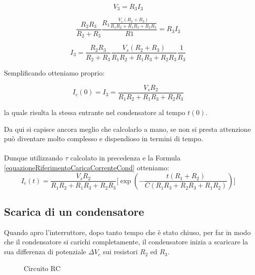\begin{equation*}
    V_3 = R_3 I_3
\end{equation*}

\begin{equation*}
    \frac{R_2R_3}{R_2+R_3} \frac{R_1 \frac{V_s(R_2+R_3)}{R_1R_2 + R_1R_3+R_2R_3}}{R1} = R_3 I_3
\end{equation*}

\begin{equation*}
    I_3 =  \frac{R_2R_3}{R_2+R_3} \frac{V_s(R_2+R_3)}{R_1R_2 + R_1R_3+R_2R_3} \frac{1}{R_3}
\end{equation*}

Semplificando otteniamo proprio:

\begin{equation*}
   I_c(0) = I_3 = \frac{V_sR_2}{R_1R_2 + R_1R_3+R_2R_3}
\end{equation*}

la quale risulta la stessa entrante nel condensatore al tempo $t(0)$.

Da qui si capisce ancora meglio che calcolarlo a mano, se non si presta attenzione può diventare molto complesso e dispendioso in termini di tempo.

\paragraph{}

Dunque utilizzando $\tau$ calcolato in precedenza e la Formula \ref{equazioneRiferimentoCaricaCorrenteCond} otteniamo:
\begin{equation}
    I_c(t) = \frac{V_sR_2}{R_1R_2 + R_1R_3+R_2R_3}\biggl[\exp(-\frac{t(R_1 + R_2)}{C(R_1R_3 + R_2R_3 + R_1R_2)})\biggl]
\end{equation}

\subsection{Scarica di un condensatore}
Quando apro l'interruttore, dopo tanto tempo che è stato chiuso, per far in modo che il condensatore si carichi completamente, il condensatore inizia a scaricare la sua differenza di potenziale $\Delta V_c$ sui resistori $R_2$ ed $R_3$.

\begin{figure}[H]
    \centering
    \caption{Circuito RC}
    \label{fig:CircuitoRC1Aperto}
\end{figure}

